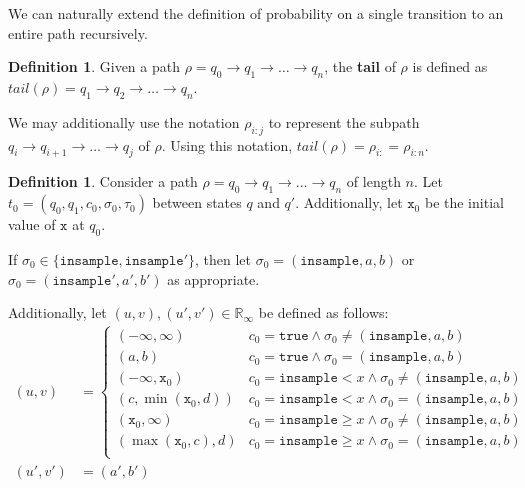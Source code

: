 \documentclass[12pt]{article}
\newcommand{\RR}{\mathbb{R}}
\newcommand{\gguard}[1][x]{\texttt{insample}\geq #1}
\newcommand{\lguard}[1][x]{\texttt{insample} < #1}
\theoremstyle{definition}
\newtheorem{defn}[thm]{Definition}
\begin{document}
We can naturally  extend the definition of probability on a single transition to an entire path recursively.

\begin{defn}
    Given a path $\rho = q_0\to q_1\to \ldots \to q_n$, the \textbf{tail} of $\rho$ is defined as $tail(\rho) = q_1\to q_2 \to \ldots\to q_n$. 

    We may additionally use the notation $\rho_{i:j}$ to represent the subpath $q_i\to q_{i+1}\to \ldots \to q_j$ of $\rho$. Using this notation, $tail(\rho) = \rho_{i:} = \rho_{i:n}$.
\end{defn}

\begin{defn}
    Consider a path $\rho = q_0\to q_1\to \ldots \to q_n$ of length $n$. Let $t_0=(q_0, q_1, c_0, \sigma_0, \tau_0)$ between states $q$ and $q'$. Additionally, let $\texttt{x}_0$ be the initial value of $\texttt{x}$ at $q_0$. 
    
    If $\sigma_0 \in \{\texttt{insample}, \texttt{insample}'\}$, then let $\sigma_0 = (\texttt{insample}, a, b)$ or $\sigma_0 = (\texttt{insample}', a', b')$ as appropriate. 

    Additionally, let $(u, v), (u', v')\in \RR_{\infty}$ be defined as follows:
    \begin{align*}
        (u, v) &= \begin{cases}
        (-\infty, \infty) & c_0=\texttt{true}\land \sigma_0 \neq (\texttt{insample}, a, b)\\
        (a, b) &c_0=\texttt{true}\land \sigma_0 = (\texttt{insample}, a, b)\\
        (-\infty, \texttt{x}_0) & c_0=\lguard\land \sigma_0 \neq (\texttt{insample}, a, b)\\
        (c, \min(\texttt{x}_0, d)) &c_0=\lguard\land \sigma_0 = (\texttt{insample}, a, b)\\
        (\texttt{x}_0, \infty) & c_0=\gguard\land \sigma_0 \neq (\texttt{insample}, a, b)\\
        (\max(\texttt{x}_0, c), d) &c_0=\gguard\land \sigma_0 = (\texttt{insample}, a, b)\\
    \end{cases}\\
    (u', v')& = (a', b')\end{align*}


\end{defn}
\end{document}
